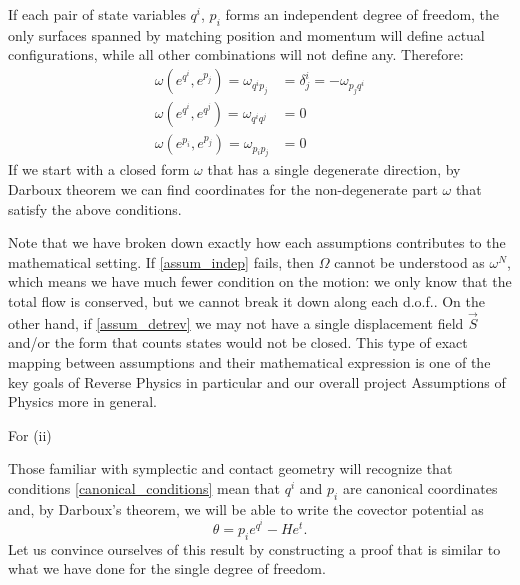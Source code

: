 \documentclass[10pt,twocolumn, nofootinbib]{revtex4-2}
\begin{document}
If each pair of state variables $q^i$, $p_i$ forms an independent degree of freedom, the only surfaces spanned by matching position and momentum will define actual configurations, while all other combinations will not define any. Therefore:
\begin{equation}\label{canonical_conditions}
	\begin{aligned}
		\omega(e^{q^i}, e^{p_j}) = \omega_{q^i p_j} &= \delta^i_j = - \omega_{p_j q^i} \\
		\omega(e^{q^i}, e^{q^j}) = \omega_{q^i q^j} &= 0 \\
		\omega(e^{p_i}, e^{p_j}) = \omega_{p_i p_j} &= 0
	\end{aligned}
\end{equation}
If we start with a closed form $\omega$ that has a single degenerate direction, by Darboux theorem we can find coordinates for the non-degenerate part $\omega$ that satisfy the above conditions.

Note that we have broken down exactly how each assumptions contributes to the mathematical setting. If \ref{assum_indep} fails, then $\Omega$ cannot be understood as $\omega^N$, which means we have much fewer condition on the motion: we only know that the total flow is conserved, but we cannot break it down along each d.o.f.. On the other hand, if \ref{assum_detrev} we may not have a single displacement field $\vec{S}$ and/or the form that counts states would not be closed. This type of exact mapping between assumptions and their mathematical expression is one of the key goals of Reverse Physics in particular and our overall project Assumptions of Physics more in general.

For (ii)

Those familiar with symplectic and contact geometry will recognize that conditions \ref{canonical_conditions} mean that $q^i$ and $p_i$ are canonical coordinates and, by Darboux's theorem, we will be able to write the covector potential as
\begin{equation}\label{mdof_potential_expression}
	\theta = p_i e^{q^i} - H e^t.
\end{equation}
Let us convince ourselves of this result by constructing a proof that is similar to what we have done for the single degree of freedom.
\end{document}
